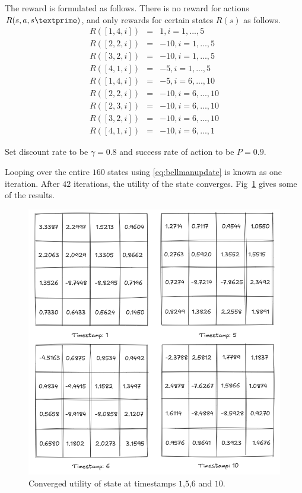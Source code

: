 The reward is formulated as follows. There is no reward for actions $R(s, a, s\textprime)$, and only rewards for certain states $R(s)$ as follows.
\begin{eqnarray}
	R([1,4,i]) &=& 1, i=1,...,5 \nonumber \\
	R([2,2,i]) &=& -10, i=1,...,5 \nonumber \\
	R([3,2,i]) &=& -10, i=1,...,5 \nonumber \\
	R([4,1,i]) &=& -5, i=1,...,5 \nonumber \\
	R([1,4,i]) &=& -5, i=6,...,10 \nonumber \\
	R([2,2,i]) &=& -10, i=6,...,10 \nonumber \\
	R([2,3,i]) &=& -10, i=6,...,10 \nonumber \\
	R([3,2,i]) &=& -10, i=6,...,10 \nonumber \\
	R([4,1,i]) &=& -10, i=6,...,1 \nonumber
\end{eqnarray}

Set discount rate to be $\gamma=0.8$ and success rate of action to be $P=0.9$.

Looping over the entire $160$ states using \eqref{eq:bellmanupdate} is known as one iteration. After $42$ iterations, the utility of the state converges. Fig~\ref{fig:valueiterationexp2} gives some of the results.

\begin{figure}[!htb]
	\centering
	\includegraphics[width=\textwidth]{./chapters/part-1/figures/valueiterationexp2.png}
	\caption{Converged utility of state at timestamps $1$,$5$,$6$ and $10$.}
	\label{fig:valueiterationexp2}
\end{figure}

